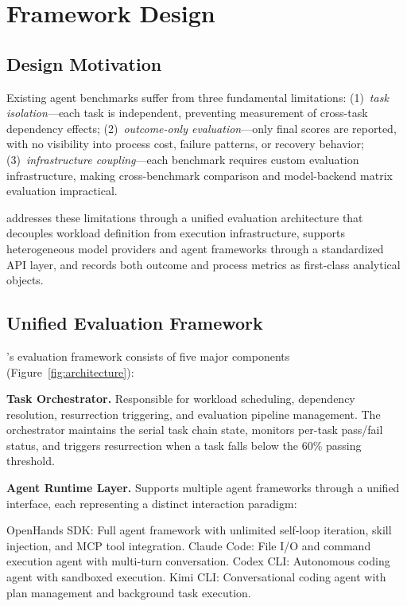 \section{Framework Design}

\subsection{Design Motivation}

Existing agent benchmarks suffer from three fundamental limitations: (1)~\emph{task isolation}---each task is independent, preventing measurement of cross-task dependency effects; (2)~\emph{outcome-only evaluation}---only final scores are reported, with no visibility into process cost, failure patterns, or recovery behavior; (3)~\emph{infrastructure coupling}---each benchmark requires custom evaluation infrastructure, making cross-benchmark comparison and model-backend matrix evaluation impractical.

\eva{} addresses these limitations through a unified evaluation architecture that decouples workload definition from execution infrastructure, supports heterogeneous model providers and agent frameworks through a standardized API layer, and records both outcome and process metrics as first-class analytical objects.

\subsection{Unified Evaluation Framework}

\eva{}'s evaluation framework consists of five major components (Figure~\ref{fig:architecture}):

\textbf{Task Orchestrator.}
Responsible for workload scheduling, dependency resolution, resurrection triggering, and evaluation pipeline management.
The orchestrator maintains the serial task chain state, monitors per-task pass/fail status, and triggers resurrection when a task falls below the 60\% passing threshold.

\textbf{Agent Runtime Layer.}
Supports multiple agent frameworks through a unified interface, each representing a distinct interaction paradigm:

OpenHands SDK: Full agent framework with unlimited self-loop iteration, skill injection, and MCP tool integration.
Claude Code: File I/O and command execution agent with multi-turn conversation.
Codex CLI: Autonomous coding agent with sandboxed execution.
Kimi CLI: Conversational coding agent with plan management and background task execution.

